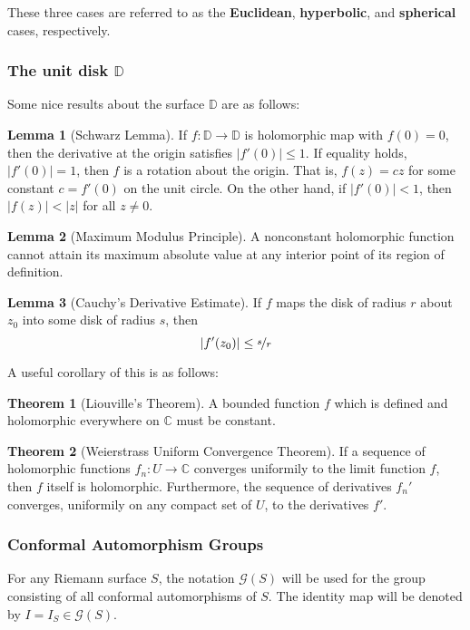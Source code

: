 \documentclass{article}
\theoremstyle{definition}
\newtheorem{theorem}{Theorem}
\newtheorem{lemma}{Lemma}
\begin{document}
    These three cases are referred to as the \textbf{Euclidean}, \textbf{hyperbolic}, and \textbf{spherical} cases, respectively.\\

    \subsubsection{The unit disk $\mathbb{D}$}
    Some nice results about the surface $\mathbb{D}$ are as follows:
    \begin{lemma}[Schwarz Lemma]
        If $f:\mathbb{D}\to\mathbb{D}$ is holomorphic map with $f(0)=0$, then the derivative at the origin satisfies $|f'(0)|\leq 1$.
        If equality holds, $|f'(0)| = 1$, then $f$ is a rotation about the origin. That is, $f(z)=cz$ for some constant $c=f'(0)$
        on the unit circle. On the other hand, if $|f'(0)|<1$, then $|f(z)|<|z|$ for all $z\neq 0$.
    \end{lemma}
    \begin{lemma}[Maximum Modulus Principle]
        A nonconstant holomorphic function cannot attain its maximum absolute value at any interior point of its region of definition.
    \end{lemma}
    \begin{lemma}[Cauchy's Derivative Estimate]
        If $f$ maps the disk of radius $r$ about $z_0$ into some disk of radius $s$, then
        \[ |f'(z_0)| \leq \nicefrac{s}{r} \]
    \end{lemma}
    A useful corollary of this is as follows:
    \begin{theorem}[Liouville's Theorem]
        A bounded function $f$ which is defined and holomorphic everywhere on $\mathbb{C}$ must be constant.
    \end{theorem}
    \begin{theorem}[Weierstrass Uniform Convergence Theorem]
        If a sequence of holomorphic functions $f_n:U\to\mathbb{C}$ converges uniformily to the limit function $f$, then $f$ itself
        is holomorphic. Furthermore, the sequence of derivatives $f_n'$ converges, uniformily on any compact set of $U$, to the
        derivatives $f'$.
    \end{theorem}

    \subsubsection{Conformal Automorphism Groups}
    For any Riemann surface $S$, the notation $\mathcal{G}(S)$ will be used for the group consisting of all conformal automorphisms
    of $S$. The identity map will be denoted by $I = I_S\in\mathcal{G}(S)$.
\end{document}

